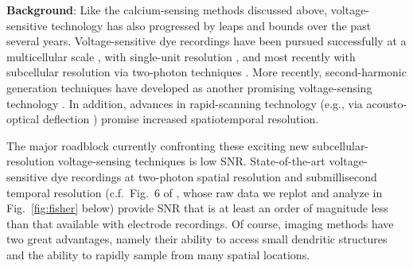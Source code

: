 \documentclass[12pt]{article}
\begin{document}
\noindent \textbf{Background}: Like the calcium-sensing methods
discussed above, voltage-sensitive technology has also progressed by
leaps and bounds over the past several years.  Voltage-sensitive dye
recordings have been pursued successfully at a multicellular scale
\cite{TKGA99,Petersen03,Benucci07,Seidemann08}, with single-unit
resolution \cite{Frost07}, and most recently with subcellular
resolution via two-photon techniques
\cite{Djurisic04,Canepari07,Fisher08,Djurisic08}.  More recently,
second-harmonic generation techniques have developed as another
promising voltage-sensing technology
\cite{Dombeck04,Sacconi06,NURIYA06}.  In addition, advances in
rapid-scanning technology (e.g., via acousto-optical deflection
\cite{Iyer06,Vucinic07}) promise increased spatiotemporal resolution.

The major roadblock currently confronting these exciting new
subcellular-resolution voltage-sensing techniques is low SNR.
State-of-the-art voltage-sensitive dye recordings at two-photon
spatial resolution and submillisecond temporal resolution (c.f.\ Fig.\
6 of \cite{Fisher08}, whose raw data we replot and analyze in
Fig.~\ref{fig:fisher} below) provide SNR that is at least an order of
magnitude less than that available with electrode recordings.  Of
course, imaging methods have two great advantages, namely their
ability to access small dendritic structures and the ability to
rapidly sample from many spatial locations.
\end{document}
